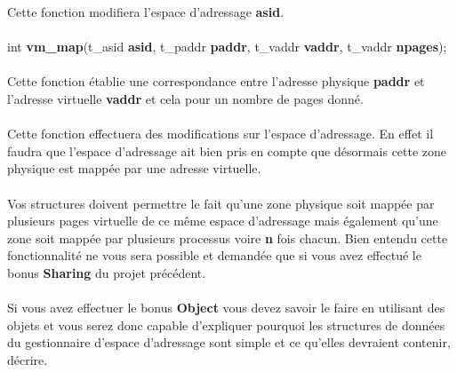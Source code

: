 \documentclass[10pt,a4wide]{article}
\begin{document}
Cette fonction modifiera l'espace d'adressage \textbf{asid}.

\paragraph{}

\hspace{1.5cm}int \textbf{vm\_map}(t\_asid \textbf{asid},
				   t\_paddr \textbf{paddr},
                                   t\_vaddr \textbf{vaddr},
                                   t\_vaddr \textbf{npages});

\paragraph{}

Cette fonction \'etablie une correspondance entre l'adresse physique
\textbf{paddr} et l'adresse virtuelle \textbf{vaddr} et cela pour
un nombre de pages donn\'e.

\paragraph{}

Cette fonction effectuera des modifications sur l'espace d'adressage.
En effet il faudra que l'espace d'adressage ait bien pris en compte que
d\'esormais cette zone physique est mapp\'ee par une adresse virtuelle.

\paragraph{}

Vos structures doivent permettre le fait qu'une zone physique soit mapp\'ee
par plusieurs pages virtuelle de ce m\^eme espace d'adressage mais \'egalement
qu'une zone soit mapp\'ee par plusieurs processus voire \textbf{n} fois
chacun. Bien entendu cette fonctionnalit\'e ne vous sera possible et demand\'ee
que si vous avez effectu\'e le bonus \textbf{Sharing} du projet pr\'ec\'edent.

\paragraph{}

Si vous avez effectuer le bonus \textbf{Object} vous devez savoir le faire
en utilisant des objets et vous serez donc capable d'expliquer pourquoi
les structures de donn\'ees du gestionnaire d'espace d'adressage sont
simple et ce qu'elles devraient contenir, d\'ecrire.
\end{document}
